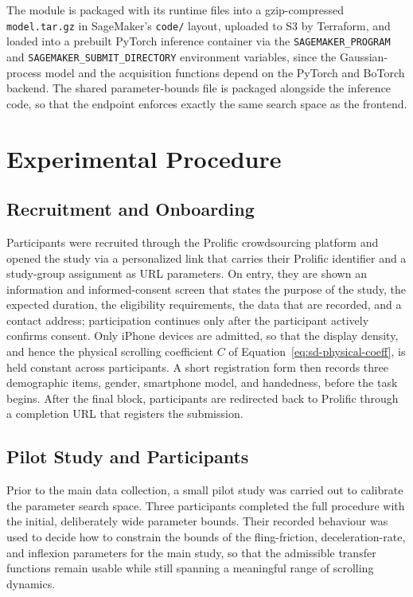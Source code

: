 \documentclass[12pt,a4paper]{report}
\begin{document}
        The module is packaged with its runtime files into a gzip-compressed \texttt{model.tar.gz} in SageMaker's \texttt{code/} layout, uploaded to S3 by Terraform, and loaded into a prebuilt PyTorch inference container via the \texttt{SAGEMAKER\_PROGRAM} and \texttt{SAGEMAKER\_SUBMIT\_DIRECTORY} environment variables, since the Gaussian-process model and the acquisition functions depend on the PyTorch and BoTorch backend. The shared parameter-bounds file is packaged alongside the inference code, so that the endpoint enforces exactly the same search space as the frontend.

        \chapter{Experimental Procedure}
        \label{sec:procedure}

        \section{Recruitment and Onboarding}

        Participants were recruited through the Prolific crowdsourcing platform and opened the study via a personalized link that carries their Prolific identifier and a study-group assignment as URL parameters. On entry, they are shown an information and informed-consent screen that states the purpose of the study, the expected duration, the eligibility requirements, the data that are recorded, and a contact address; participation continues only after the participant actively confirms consent. Only iPhone devices are admitted, so that the display density, and hence the physical scrolling coefficient $C$ of Equation~\eqref{eq:sd-physical-coeff}, is held constant across participants. A short registration form then records three demographic items, gender, smartphone model, and handedness, before the task begins. After the final block, participants are redirected back to Prolific through a completion URL that registers the submission.

        \section{Pilot Study and Participants}

        Prior to the main data collection, a small pilot study was carried out to calibrate the parameter search space. Three participants completed the full procedure with the initial, deliberately wide parameter bounds. Their recorded behaviour was used to decide how to constrain the bounds of the fling-friction, deceleration-rate, and inflexion parameters for the main study, so that the admissible transfer functions remain usable while still spanning a meaningful range of scrolling dynamics.
\end{document}
